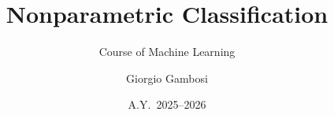 %
%
%
%
%
\usepackage{amsmath,amssymb}
\usepackage{tikz}
\usetikzlibrary{arrows.meta,shapes,positioning,calc}
\usepackage{pgfplots}
\pgfplotsset{compat=1.18}
\usepackage{subcaption}
\usepackage{booktabs}
\usepackage{xcolor}
\usepackage{mathtools}

\newcommand{\argmax}[1]{\underset{#1}{\operatorname{arg\,max}}}
\newcommand{\kh}{\kappa_h}

\title{Nonparametric Classification}
\subtitle{Course of Machine Learning}
\author{Giorgio Gambosi}
\date{A.Y.\ 2025--2026}



\begin{frame}[plain]
  \titlepage
\end{frame}

